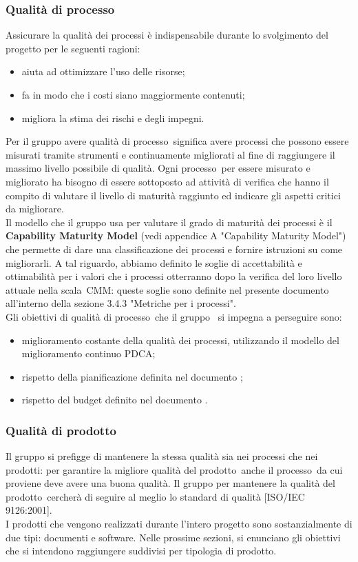 \documentclass[../PianoDiQualifica.tex]{subfiles}
\begin{document}
		\subsubsection{Qualità di processo}
		Assicurare la qualità dei processi è indispensabile durante lo svolgimento del progetto per le seguenti ragioni:
		\begin{itemize}
		\item aiuta ad ottimizzare l'uso delle risorse;
		\item fa in modo che i costi siano maggiormente contenuti;
		\item migliora la stima dei rischi e degli impegni.
		\end{itemize}
		Per il gruppo avere qualità di processo\g\ significa avere processi che possono essere misurati tramite strumenti e continuamente migliorati al fine di raggiungere il massimo livello possibile di qualità. Ogni processo\g\ 
per essere misurato e migliorato ha bisogno di essere sottoposto ad attività di verifica che hanno il compito di valutare il livello di maturità raggiunto ed indicare gli aspetti critici da migliorare.\\
		Il modello che il gruppo usa per valutare il grado di maturità dei processi è il \textbf{Capability Maturity Model} (vedi appendice A "Capability Maturity Model") che permette di dare una classificazione dei processi e fornire istruzioni su come migliorarli. A tal riguardo, abbiamo definito le soglie di accettabilità e ottimabilità per i valori che i processi otterranno dopo la verifica del loro livello attuale nella scala\g\ CMM\g: queste soglie sono definite nel presente documento all'interno della sezione 3.4.3 "Metriche per i processi".\\
		Gli obiettivi di qualità di processo\g\ che il gruppo \leaf\ si impegna a perseguire sono:
		\begin{itemize}
			\item miglioramento costante della qualità dei processi, utilizzando il modello del miglioramento continuo PDCA\g;
			\item rispetto della pianificazione definita nel documento \pianodiprogettov;
			\item rispetto del budget definito nel documento \pianodiprogettov.
		\end{itemize}
		\subsubsection{Qualità di prodotto}
		Il gruppo si prefigge di mantenere la stessa qualità sia nei processi che nei prodotti: per garantire la migliore qualità del prodotto\g\ anche il processo\g\ da cui proviene deve avere una buona qualità. Il gruppo per mantenere la qualità del prodotto\g\ 
cercherà di seguire al meglio lo standard di qualità [ISO/IEC 9126:2001].\\
		I prodotti che vengono realizzati durante l'intero progetto sono sostanzialmente di due tipi: documenti e software\g. Nelle prossime sezioni, si enunciano gli obiettivi che si intendono raggiungere suddivisi per tipologia di prodotto\g.
\end{document}
